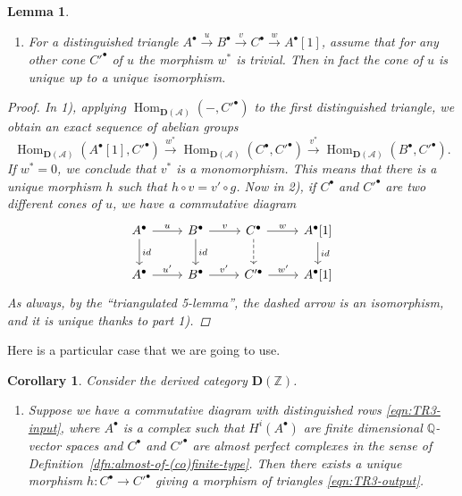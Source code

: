 \documentclass{article}
\DeclareMathOperator{\Hom}{Hom}
\newcommand{\QQ}{\mathbb{Q}}
\newcommand{\ZZ}{\mathbb{Z}}
\newtheorem{lemma}[theorem]{Lemma}
\newtheorem{corollary}[theorem]{Corollary}
\theoremstyle{definition}
\numberwithin{equation}{section}
\begin{document}
\begin{appendices}
\begin{lemma}
\begin{enumerate}
  \item[2)] For a distinguished triangle
    $A^\bullet \xrightarrow{u} B^\bullet \xrightarrow{v} C^\bullet \xrightarrow{w} A^\bullet[1]$,
    assume that for any other cone $C'^\bullet$
    of $u$ the morphism $w^*$ is trivial. Then in fact the cone of $u$ is unique
    up to a unique isomorphism.
  \end{enumerate}

  \begin{proof}
    In 1), applying $\Hom_{\mathbf{D} (\mathcal{A})} (-, C'^\bullet)$ to the
    first distinguished triangle, we obtain an exact sequence of abelian groups
    \[ \Hom_{\mathbf{D} (\mathcal{A})} (A^\bullet [1], C'^\bullet) \xrightarrow{w^*}
    \Hom_{\mathbf{D} (\mathcal{A})} (C^\bullet, C'^\bullet) \xrightarrow{v^*}
    \Hom_{\mathbf{D} (\mathcal{A})} (B^\bullet, C'^\bullet). \]
    If $w^* = 0$, we conclude that $v^*$ is a monomorphism. This means that
    there is a unique morphism $h$ such that $h\circ v = v'\circ g$. Now in 2),
    if $C^\bullet$ and $C'^\bullet$ are two different cones of $u$, we have a
    commutative diagram
    \[ \begin{tikzcd}
      A^\bullet\ar{r}{u}\ar{d}{id} & B^\bullet\ar{r}{v}\ar{d}{id} & C^\bullet\ar{r}{w}\ar[dashed]{d} & A^\bullet [1]\ar{d}{id} \\
      A^\bullet\ar{r}{u'} & B^\bullet\ar{r}{v'} & C'^\bullet\ar{r}{w'} & A^\bullet [1]
    \end{tikzcd} \]
    As always, by the ``triangulated 5-lemma'', the dashed arrow is an
    isomorphism, and it is unique thanks to part 1).
  \end{proof}
\end{lemma}

Here is a particular case that we are going to use.

\begin{corollary}
  \label{TR3-TR1-with-uniqueness}
  Consider the derived category $\mathbf{D} (\ZZ)$.

  \begin{enumerate}
  \item[1)] Suppose we have a commutative diagram with distinguished rows
    \eqref{eqn:TR3-input}, where $A^\bullet$ is a complex such that
    $H^i (A^\bullet)$ are finite dimensional $\QQ$-vector spaces and
    $C^\bullet$ and $C'^\bullet$ are almost perfect complexes in the sense of
    Definition~\ref{dfn:almost-of-(co)finite-type}. Then there exists a unique
    morphism ${h\colon C^\bullet \to C'^\bullet}$ giving a morphism of triangles
    \eqref{eqn:TR3-output}.


\end{enumerate}
\end{corollary}
\end{appendices}
\end{document}
